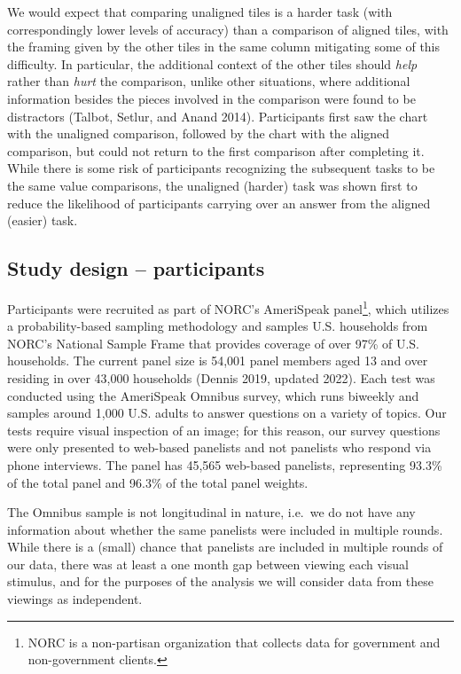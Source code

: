 \documentclass[
]{jds}
\begin{document}
We would expect that comparing unaligned tiles is a harder task (with
correspondingly lower levels of accuracy) than a comparison of aligned
tiles, with the framing given by the other tiles in the same column
mitigating some of this difficulty. In particular, the additional
context of the other tiles should \emph{help} rather than \emph{hurt}
the comparison, unlike other situations, where additional information
besides the pieces involved in the comparison were found to be
distractors (Talbot, Setlur, and Anand 2014). Participants first saw the
chart with the unaligned comparison, followed by the chart with the
aligned comparison, but could not return to the first comparison after
completing it. While there is some risk of participants recognizing the
subsequent tasks to be the same value comparisons, the unaligned
(harder) task was shown first to reduce the likelihood of participants
carrying over an answer from the aligned (easier) task.

\hypertarget{study-design-participants}{%
\subsection{Study design --
participants}\label{study-design-participants}}

Participants were recruited as part of NORC's AmeriSpeak
panel\footnote{NORC is a non-partisan organization that collects data
  for government and non-government clients.}, which utilizes a
probability-based sampling methodology and samples U.S. households from
NORC's National Sample Frame that provides coverage of over 97\% of U.S.
households. The current panel size is 54,001 panel members aged 13 and
over residing in over 43,000 households (Dennis 2019, updated 2022).
Each test was conducted using the AmeriSpeak Omnibus survey, which runs
biweekly and samples around 1,000 U.S. adults to answer questions on a
variety of topics. Our tests require visual inspection of an image; for
this reason, our survey questions were only presented to web-based
panelists and not panelists who respond via phone interviews. The panel
has 45,565 web-based panelists, representing 93.3\% of the total panel
and 96.3\% of the total panel weights.

The Omnibus sample is not longitudinal in nature, i.e.~we do not have
any information about whether the same panelists were included in
multiple rounds. While there is a (small) chance that panelists are
included in multiple rounds of our data, there was at least a one month
gap between viewing each visual stimulus, and for the purposes of the
analysis we will consider data from these viewings as independent.
\end{document}
